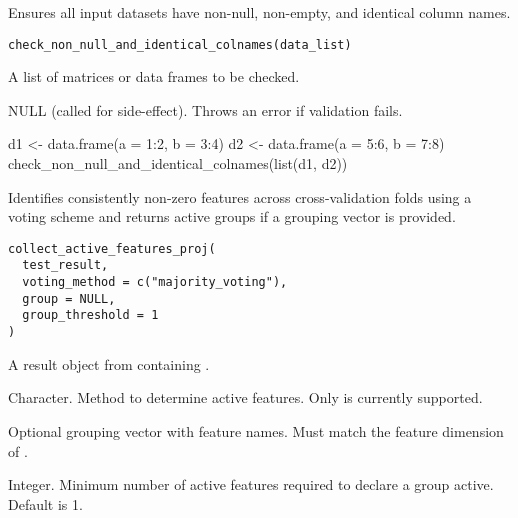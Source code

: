 \documentclass[a4paper]{book}
\begin{document}
%
\begin{Description}
Ensures all input datasets have non-null, non-empty, and identical column names.
\end{Description}
%
\begin{Usage}
\begin{verbatim}
check_non_null_and_identical_colnames(data_list)
\end{verbatim}
\end{Usage}
%
\begin{Arguments}
\begin{ldescription}
\item[\code{data\_list}] A list of matrices or data frames to be checked.
\end{ldescription}
\end{Arguments}
%
\begin{Value}
NULL (called for side-effect). Throws an error if validation fails.
\end{Value}
%
\begin{Examples}
\begin{ExampleCode}
d1 <- data.frame(a = 1:2, b = 3:4)
d2 <- data.frame(a = 5:6, b = 7:8)
check_non_null_and_identical_colnames(list(d1, d2))

\end{ExampleCode}
\end{Examples}
%
\begin{Description}
Identifies consistently non-zero features across cross-validation folds using a voting scheme and returns active groups if a grouping vector is provided.
\end{Description}
%
\begin{Usage}
\begin{verbatim}
collect_active_features_proj(
  test_result,
  voting_method = c("majority_voting"),
  group = NULL,
  group_threshold = 1
)
\end{verbatim}
\end{Usage}
%
\begin{Arguments}
\begin{ldescription}
\item[\code{test\_result}] A result object from  containing .

\item[\code{voting\_method}] Character. Method to determine active features. Only  is currently supported.

\item[\code{group}] Optional grouping vector with feature names. Must match the feature dimension of .

\item[\code{group\_threshold}] Integer. Minimum number of active features required to declare a group active. Default is 1.
\end{ldescription}
\end{Arguments}
\end{document}
